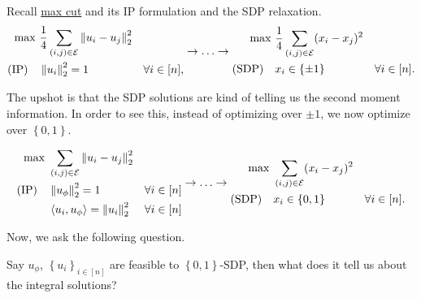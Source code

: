 Recall \hyperref[prb:max-cut]{max cut} and its IP formulation and the SDP relaxation.
\[
	\begin{aligned}
		\max~            & \frac{1}{4} \sum_{(i, j)\in \mathcal{\MakeUppercase{e}} } \left\lVert u_i - u_j\right\rVert _2^2                     \\
		(\text{IP})\quad & \left\lVert u_i\right\rVert _2^2 = 1                                                             & \forall i\in [n],
	\end{aligned} \to \ldots \to \begin{aligned}
		\max~             & \frac{1}{4} \sum_{(i, j)\in \mathcal{\MakeUppercase{e}} }  (x_i - x_j)^{2}                     \\
		(\text{SDP})\quad & x_i \in \left\{ \pm 1 \right\}                                             & \forall i\in [n].
	\end{aligned}
\]

The upshot is that the SDP solutions are kind of telling us the second moment information. In order to see this, instead of optimizing over \(\pm 1\), we now optimize over \(\left\{ 0, 1 \right\} \).

\[
	\begin{aligned}
		\max~            & \sum_{(i, j)\in \mathcal{\MakeUppercase{e}} } \left\lVert u_i - u_j\right\rVert _2^2                    \\
		(\text{IP})\quad & \left\lVert u_{\phi}\right\rVert _2^2 = 1                                            & \forall i\in [n] \\
		                 & \left\langle u_i, u_{\phi } \right\rangle = \left\lVert u_i\right\rVert _2^2         & \forall i\in [n]
	\end{aligned} \to \ldots \to \begin{aligned}
		\max~             & \sum_{(i, j)\in \mathcal{\MakeUppercase{e}} }  (x_i - x_j)^{2}                     \\
		(\text{SDP})\quad & x_i \in \left\{ 0, 1 \right\}                                  & \forall i\in [n].
	\end{aligned}
\]

Now, we ask the following question.

\begin{problem*}
	Say \(u_\phi \), \(\left\{ u_{i}  \right\} _{i\in [n]}\) are feasible to \(\left\{ 0, 1 \right\} \)-SDP, then what does it tell us about the integral solutions?
\end{problem*}

